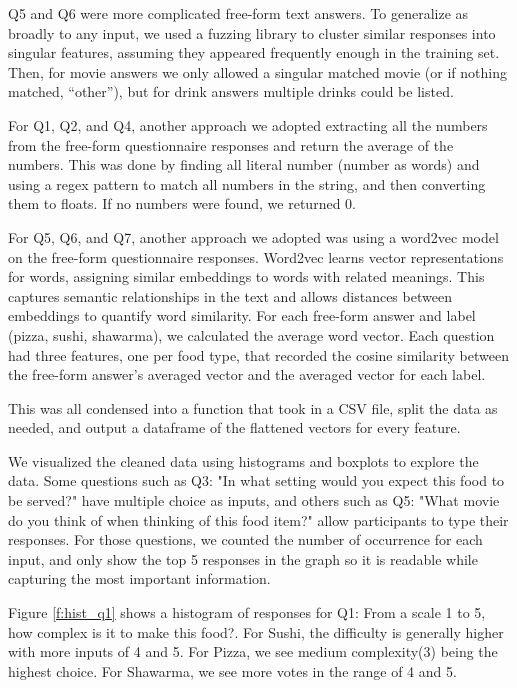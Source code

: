 Q5 and Q6 were more complicated free-form text answers. To generalize as broadly to any input, we used a fuzzing library to cluster similar responses into singular features, assuming they appeared frequently enough in the training set. Then, for movie answers we only allowed a singular matched movie (or if nothing matched, “other”), but for drink answers multiple drinks could be listed.

For Q1, Q2, and Q4, another approach we adopted extracting all the numbers from the free-form questionnaire responses and return the average of the numbers. This was done by finding all literal number (number as words) and using a regex pattern to match all numbers in the string, and then converting them to floats. If no numbers were found, we returned 0.

For Q5, Q6, and Q7, another approach we adopted was using a word2vec model on the free-form questionnaire responses. Word2vec learns vector representations for words, assigning similar embeddings to words with related meanings. This captures semantic relationships in the text and allows distances between embeddings to quantify word similarity. For each free-form answer and label (pizza, sushi, shawarma), we calculated the average word vector. Each question had three features, one per food type, that recorded the cosine similarity between the free-form answer's averaged vector and the averaged vector for each label.

This was all condensed into a function that took in a CSV file, split the data as needed, and output a dataframe of the flattened vectors for every feature.

We visualized the cleaned data using histograms and boxplots to explore the data. Some questions such as Q3: "In what setting 
would you expect this food to be served?" have multiple choice as inputs, and others such as Q5: "What movie do you think of when thinking of this food item?"
allow participants to type their responses. For those questions, we counted the number of occurrence for each input, and only show the top 5 responses in the graph 
so it is readable while capturing the most important information.

Figure \ref{f:hist_q1} shows a histogram of responses for Q1: From a scale 1 to 5, how complex is it to make this food?. For Sushi, 
the difficulty is generally higher with more inputs of 4 and 5. For Pizza, we see medium complexity(3) being the highest choice. For Shawarma,
we see more votes in the range of 4 and 5.


